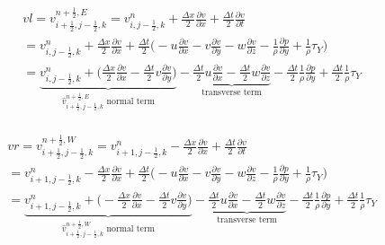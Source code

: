 \documentclass{article}
\numberwithin{equation}{subsection}
\begin{document}
\begin{align}
\begin{split}
& vl = v_{i+\frac{1}{2},j-\frac{1}{2},k}^{n+\frac{1}{2},E} = v_{i,j-\frac{1}{2},k}^n + \frac{\Delta x}{2}\frac{\partial v}{\partial x} + \frac{\Delta t}{2}\frac{\partial v}{\partial t} \\
&= v_{i,j-\frac{1}{2},k}^n + \frac{\Delta x}{2} \frac{\partial v}{\partial x} + \frac{\Delta t}{2} \Big( -u\frac{\partial v}{\partial x} -v\frac{\partial v}{\partial y} -w\frac{\partial v}{\partial z} - \frac{1}{\rho}\frac{\partial p}{\partial y} +\frac{1}{\rho}\tau_Y\Big) \\
&= \underbrace{v_{i,j-\frac{1}{2},k}^n + \Big(\frac{\Delta x}{2}\frac{\partial v}{\partial x} - \frac{\Delta t}{2} v\frac{\partial v}{\partial y}\Big)}_\text{$\widehat{v}_{i+\frac{1}{2},j-\frac{1}{2},k}^{n+\frac{1}{2},E}$ normal term} -\underbrace{\frac{\Delta t}{2}u\frac{\partial v}{\partial x} - \frac{\Delta t}{2}w\frac{\partial v}{\partial z}}_\text{transverse term} - \frac{\Delta t}{2}\frac{1}{\rho}\frac{\partial p}{\partial y} + \frac{\Delta t}{2}\frac{1}{\rho}\tau_Y
\end{split}
\end{align}

\begin{align}
\begin{split}
& vr = v_{i+\frac{1}{2},j-\frac{1}{2},k}^{n+\frac{1}{2},W} = v_{i+1,j-\frac{1}{2},k}^n - \frac{\Delta x}{2}\frac{\partial v}{\partial x} + \frac{\Delta t}{2}\frac{\partial v}{\partial t} \\
&= v_{i+1,j-\frac{1}{2},k}^n - \frac{\Delta x}{2} \frac{\partial v}{\partial x} + \frac{\Delta t}{2} \Big( -u\frac{\partial v}{\partial x} -v\frac{\partial v}{\partial y} -w\frac{\partial v}{\partial z} - \frac{1}{\rho}\frac{\partial p}{\partial y} +\frac{1}{\rho}\tau_Y\Big) \\
&= \underbrace{v_{i+1,j-\frac{1}{2},k}^n + \Big(-\frac{\Delta x}{2}\frac{\partial v}{\partial x} - \frac{\Delta t}{2} v\frac{\partial v}{\partial y}\Big)}_\text{$\widehat{v}_{i+\frac{1}{2},j-\frac{1}{2},k}^{n+\frac{1}{2},W}$ normal term} -\underbrace{\frac{\Delta t}{2}u\frac{\partial v}{\partial x} - \frac{\Delta t}{2}w\frac{\partial v}{\partial z}}_\text{transverse term} - \frac{\Delta t}{2}\frac{1}{\rho}\frac{\partial p}{\partial y} + \frac{\Delta t}{2}\frac{1}{\rho}\tau_Y
\end{split}
\end{align}
\end{document}
